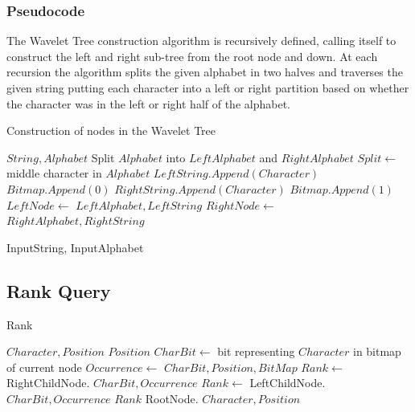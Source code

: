\subsubsection{Pseudocode}
\label{sec:nodeconstruction}
The Wavelet Tree construction algorithm is recursively defined, calling itself to construct the left and right sub-tree from the root node and down. At each recursion the algorithm splits the given alphabet in two halves and traverses the given string putting each character into a left or right partition based on whether the character was in the left or right half of the alphabet.

\begin{algorithm}
\caption{Construction of nodes in the Wavelet Tree}
\label{alg:ConstructNode}
\begin{algorithmic}
 {$String, Alphabet$}
	\State \Return
\EndIf
\State Split $Alphabet$ into $LeftAlphabet$ and $RightAlphabet$
\State $Split \gets$ middle character in $Alphabet$
		\State $LeftString.Append(Character)$
		\State $Bitmap.Append(0)$
	\Else
		\State $RightString.Append(Character)$
		\State $Bitmap.Append(1)$
	\EndIf
\EndFor
\State $LeftNode \gets$  {$LeftAlphabet, LeftString$}
\State $RightNode \gets$  {$RightAlphabet, RightString$}
\EndFunction

\State {} {InputString, InputAlphabet}
\end{algorithmic}
\end{algorithm}

\subsection{Rank Query}
\label{sec:rankDescription}

\begin{algorithm}
\caption{Rank}
\label{alg:rank}
\begin{algorithmic} 
 {$Character, Position$}
\State \Return $Position$
\EndIf
\State $CharBit \gets$ bit representing $Character$ in bitmap of current node
\State $Occurrence \gets$  {$CharBit, Position, BitMap$}
	\State $Rank \gets$ RightChildNode. {$CharBit, Occurrence$}
\Else
	\State $Rank \gets$ LeftChildNode. {$CharBit, Occurrence$}
\EndIf
\State \Return $Rank$ 
\EndFunction
\State RootNode. {$Character, Position$}
\end{algorithmic}
\end{algorithm}

